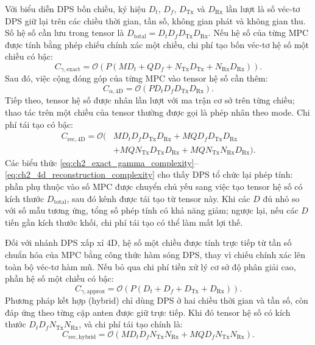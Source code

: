 Với biểu diễn DPS bốn chiều, ký hiệu \(D_t\), \(D_f\), \(D_{\mathrm{Tx}}\) và \(D_{\mathrm{Rx}}\) lần lượt là số véc-tơ DPS giữ lại trên các chiều thời gian, tần số, không gian phát và không gian thu. Số hệ số cần lưu trong tensor là \(D_{\mathrm{total}}=D_tD_fD_{\mathrm{Tx}}D_{\mathrm{Rx}}\). Nếu hệ số của từng MPC được tính bằng phép chiếu chính xác một chiều, chi phí tạo bốn véc-tơ hệ số một chiều có bậc:
\begin{equation}
C_{\gamma,\mathrm{exact}}
=
\mathcal{O}\!\left(
P(MD_t+QD_f+N_{\mathrm{Tx}}D_{\mathrm{Tx}}+N_{\mathrm{Rx}}D_{\mathrm{Rx}})
\right).
\label{eq:ch2_exact_gamma_complexity}
\end{equation}
Sau đó, việc cộng đóng góp của từng MPC vào tensor hệ số cần thêm:
\begin{equation}
C_{\alpha,\mathrm{4D}}
=
\mathcal{O}\!\left(PD_tD_fD_{\mathrm{Tx}}D_{\mathrm{Rx}}\right).
\label{eq:ch2_alpha_4d_complexity}
\end{equation}
Tiếp theo, tensor hệ số được nhân lần lượt với ma trận cơ sở trên từng chiều; thao tác trên một chiều của tensor thường được gọi là phép nhân theo mode. Chi phí tái tạo có bậc:
\begin{equation}
\begin{aligned}
C_{\mathrm{rec},\mathrm{4D}}
=\mathcal{O}\big(
&MD_tD_fD_{\mathrm{Tx}}D_{\mathrm{Rx}}
+MQD_fD_{\mathrm{Tx}}D_{\mathrm{Rx}}\\
&+MQN_{\mathrm{Tx}}D_{\mathrm{Tx}}D_{\mathrm{Rx}}
+MQN_{\mathrm{Tx}}N_{\mathrm{Rx}}D_{\mathrm{Rx}}
\big).
\end{aligned}
\label{eq:ch2_4d_reconstruction_complexity}
\end{equation}
Các biểu thức \eqref{eq:ch2_exact_gamma_complexity}--\eqref{eq:ch2_4d_reconstruction_complexity} cho thấy DPS tổ chức lại phép tính: phần phụ thuộc vào số MPC được chuyển chủ yếu sang việc tạo tensor hệ số có kích thước \(D_{\mathrm{total}}\), sau đó kênh được tái tạo từ tensor này. Khi các \(D\) đủ nhỏ so với số mẫu tương ứng, tổng số phép tính có khả năng giảm; ngược lại, nếu các \(D\) tiến gần kích thước khối, chi phí tái tạo có thể làm mất lợi thế.

Đối với nhánh DPS xấp xỉ 4D, hệ số một chiều được tính trực tiếp từ tần số chuẩn hóa của MPC bằng công thức hàm sóng DPS, thay vì chiếu chính xác lên toàn bộ véc-tơ hàm mũ. Nếu bỏ qua chi phí tiền xử lý cơ sở độ phân giải cao, phần hệ số một chiều có bậc:
\begin{equation}
C_{\gamma,\mathrm{approx}}
=
\mathcal{O}\!\left(P(D_t+D_f+D_{\mathrm{Tx}}+D_{\mathrm{Rx}})\right).
\label{eq:ch2_approx_gamma_complexity}
\end{equation}
Phương pháp kết hợp (hybrid) chỉ dùng DPS ở hai chiều thời gian và tần số, còn đáp ứng theo từng cặp anten được giữ trực tiếp. Khi đó tensor hệ số có kích thước \(D_tD_fN_{\mathrm{Tx}}N_{\mathrm{Rx}}\), và chi phí tái tạo chính là:
\begin{equation}
C_{\mathrm{rec},\mathrm{hybrid}}
=
\mathcal{O}\!\left(
MD_tD_fN_{\mathrm{Tx}}N_{\mathrm{Rx}}
+MQD_fN_{\mathrm{Tx}}N_{\mathrm{Rx}}
\right).
\label{eq:ch2_hybrid_reconstruction_complexity}
\end{equation}

